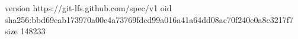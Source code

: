 version https://git-lfs.github.com/spec/v1
oid sha256:bbd69eab173970a00e4a73769fdcd99a016a41a64dd08ac70f240e0a8c3217f7
size 148233
